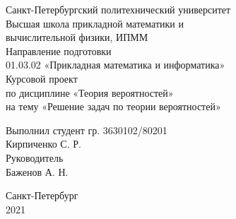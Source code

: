 \documentclass[a4paper,12pt]{article} %
\begin{document}

\large
\begin{center}
    Санкт-­Петербургский политехнический университет\\
    Высшая школа прикладной математики и\\вычислительной физики, ИПММ\\
    \vspace{5em}
    Направление подготовки\\
    01.03.02 «Прикладная математика и информатика»\\
    \vspace{3em}
    Курсовой проект\\
    по дисциплине «Теория вероятностей»\\
    на тему «Решение задач по теории вероятностей»
    \vspace{13em}
\end{center}
Выполнил студент гр. 3630102/80201\\
Кирпиченко С. Р.\\
Руководитель\\
Баженов А. Н.
\vspace{7em}
\begin{center}
    Санкт-Петербург\\
    2021
\end{center}
\thispagestyle{empty}
\newpage
\tableofcontents
{}
\newpage
\listoffigures
{}
\newpage
\listoftables
{}
\thispagestyle{empty}
\newpage
\end{document}
